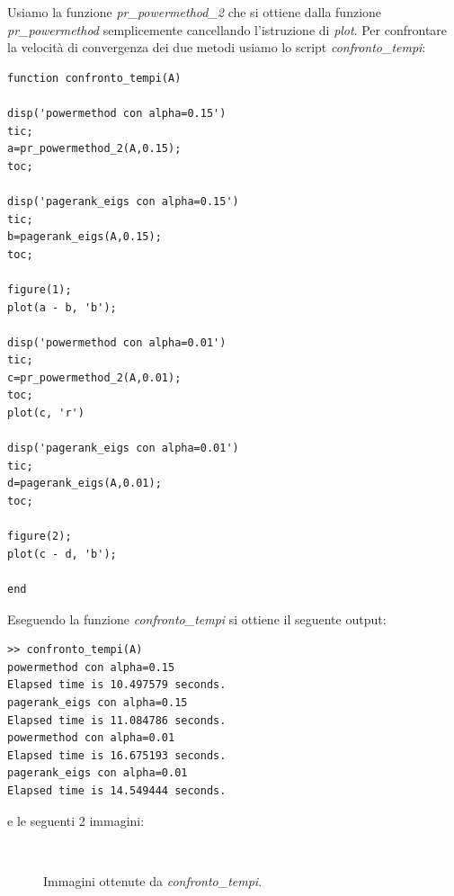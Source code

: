 \documentclass[11pt,a4paper,twoside,openright,titlepage,
                           headinclude,footinclude,BCOR5mm,
                           numbers=noenddot,cleardoublepage=empty,
                           tablecaptionabove]{scrbook}
\begin{document}
Usiamo la funzione \emph{pr\_powermethod\_2} che si ottiene dalla funzione
\emph{pr\_powermethod} semplicemente cancellando l'istruzione di \emph{plot}.
Per confrontare la velocità di convergenza dei due metodi usiamo lo script \emph{confronto\_tempi}:
\begin{lstlisting}[frame=trBL]
function confronto_tempi(A)

disp('powermethod con alpha=0.15')
tic;
a=pr_powermethod_2(A,0.15);
toc;

disp('pagerank_eigs con alpha=0.15')
tic;
b=pagerank_eigs(A,0.15);
toc;

figure(1);
plot(a - b, 'b');

disp('powermethod con alpha=0.01')
tic;
c=pr_powermethod_2(A,0.01);
toc;
plot(c, 'r')

disp('pagerank_eigs con alpha=0.01')
tic;
d=pagerank_eigs(A,0.01);
toc;

figure(2);
plot(c - d, 'b');

end
\end{lstlisting}
Eseguendo la funzione \emph{confronto\_tempi} si ottiene il seguente output:
\begin{lstlisting}[frame=lines]
>> confronto_tempi(A)
powermethod con alpha=0.15
Elapsed time is 10.497579 seconds.
pagerank_eigs con alpha=0.15
Elapsed time is 11.084786 seconds.
powermethod con alpha=0.01
Elapsed time is 16.675193 seconds.
pagerank_eigs con alpha=0.01
Elapsed time is 14.549444 seconds.
\end{lstlisting}
e le seguenti 2 immagini:
\begin{figure}[h!]
\centering
{} \\
 \quad
\caption{Immagini ottenute da \emph{confronto\_tempi}.}
\end{figure}
\end{document}
